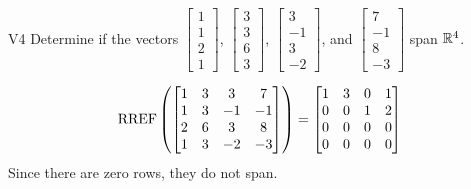 \begin{problem}{V4}
Determine if the vectors \(\begin{bmatrix} 1 \\ 1 \\ 2 \\1 \end{bmatrix}\), \(\begin{bmatrix} 3 \\ 3 \\ 6 \\ 3 \end{bmatrix}\), \(\begin{bmatrix}3 \\ -1 \\ 3 \\ -2\end{bmatrix}\), and \(\begin{bmatrix} 7 \\ -1 \\ 8 \\ -3 \end{bmatrix}\)  span \(\mathbb{R}^4\).
\end{problem}
\begin{solution}
\[\operatorname{RREF}\left(\begin{bmatrix} 1 & 3 & 3 & 7 \\ 1 & 3 & -1 & -1 \\ 2 & 6 & 3 & 8 \\ 1 & 3 & -2 & -3 \end{bmatrix}\right) = \begin{bmatrix} 1 & 3 & 0 & 1 \\ 0 & 0 & 1 & 2 \\ 0 & 0 & 0 & 0 \\ 0 & 0 & 0 & 0  \end{bmatrix}\]
Since there are zero rows, they do not span.
\end{solution}

